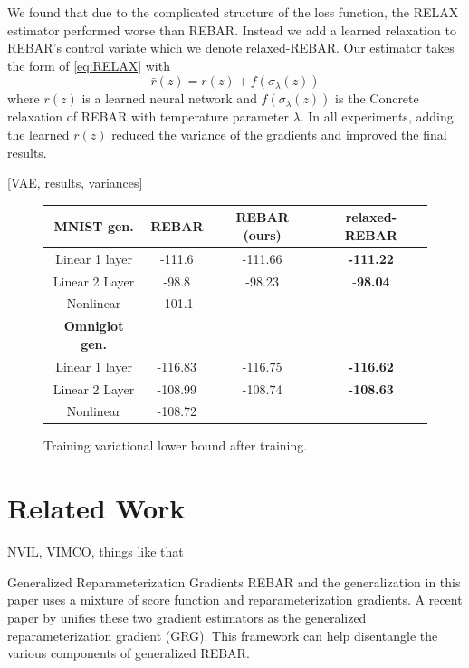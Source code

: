 \documentclass{article}
\newcommand{\relaxed}{r}
\begin{document}
We found that due to the complicated structure of the loss function, the RELAX estimator performed worse than REBAR. Instead we add a learned relaxation to REBAR's control variate which we denote relaxed-REBAR. Our estimator takes the form of \ref{eq:RELAX} with $$\bar \relaxed(z) = \relaxed(z) + f(\sigma_\lambda(z))$$ where $\relaxed(z)$ is a learned neural network and $f(\sigma_\lambda(z))$ is the Concrete relaxation of REBAR with temperature parameter $\lambda$. In all experiments, adding the learned $\relaxed(z)$ reduced the variance of the gradients and improved the final results. 

[VAE, results, variances]
\begin{figure}
\begin{center}
 \begin{tabular}{|c|c c c||} 
 \hline
 \textbf{MNIST gen.} & REBAR \citep{tucker2017rebar} & REBAR (ours) & relaxed-REBAR \\ [0.5ex] 
 \hline
 Linear 1 layer   & -111.6 & -111.66 & \textbf{-111.22} \\ 
 Linear 2 Layer & -98.8  & -98.23 & -\textbf{98.04} \\
 Nonlinear         & -101.1  &  &  \\
 \hline\hline
 \textbf{Omniglot gen.} &&&\\
 \hline
 Linear 1 layer   & -116.83  & -116.75 & \textbf{-116.62} \\ 
 Linear 2 Layer & -108.99  & -108.74 & \textbf{-108.63} \\
 Nonlinear         & -108.72  &  &  \\
 \hline
\end{tabular}
\end{center}
\caption{Training variational lower bound after training.}
\end{figure}



\section{Related Work}
\label{related work}

NVIL, VIMCO, things like that

\par{Generalized Reparameterization Gradients}
REBAR and the generalization in this paper uses a mixture of score function and reparameterization gradients.
A recent paper by \cite{ruiz2016generalized} unifies these two gradient estimators as the generalized reparameterization gradient (GRG).
This framework can help disentangle the various components of generalized REBAR.
\end{document}
